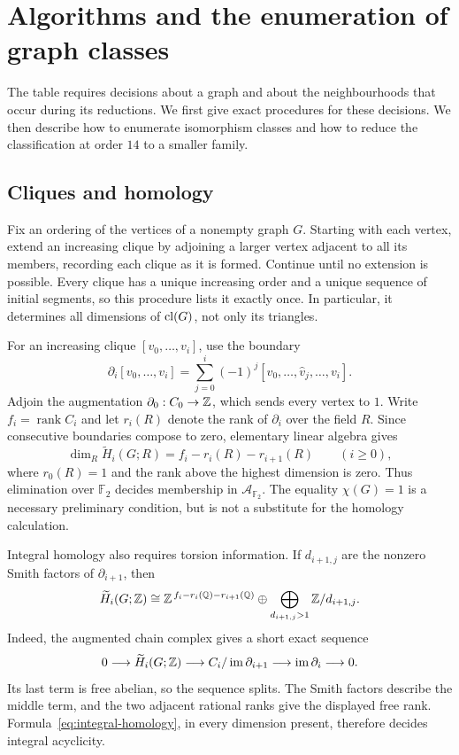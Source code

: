 \section{Algorithms and the enumeration of graph classes}\label{sec:algorithms}

The table requires decisions about a graph and about the neighbourhoods
that occur during its reductions. We first give exact procedures for
these decisions. We then describe how to enumerate isomorphism classes
and how to reduce the classification at order $14$ to a smaller family.

\subsection{Cliques and homology}

Fix an ordering of the vertices of a nonempty graph $G$. Starting with
each vertex, extend an increasing clique by adjoining a larger vertex
adjacent to all its members, recording each clique as it is formed.
Continue until no extension is possible.
Every clique has a unique increasing order and a unique sequence of
initial segments, so this procedure lists it exactly once. In particular,
it determines all dimensions of $\operatorname{cl}(G)$, not only its triangles.

For an increasing clique $[v_0,\ldots,v_i]$, use the boundary
\[
 \partial_i[v_0,\ldots,v_i]
   =\sum_{j=0}^i(-1)^j[v_0,\ldots,\widehat v_j,\ldots,v_i].
\]
Adjoin the augmentation $\partial_0:C_0\to\mathbb Z$, which sends every
vertex to $1$. Write $f_i=\operatorname{rank} C_i$ and let $r_i(R)$
denote the rank of $\partial_i$ over the field $R$. Since consecutive
boundaries compose to zero, elementary linear algebra gives
\begin{equation}\label{eq:betti}
 \dim_R\widetilde H_i(G;R)=f_i-r_i(R)-r_{i+1}(R)
 \qquad(i\ge0),
\end{equation}
where $r_0(R)=1$ and the rank above the highest dimension is zero.
Thus elimination over $\mathbb F_2$ decides membership in
$\mathcal A_{\mathbb F_2}$.
The equality $\chi(G)=1$ is a necessary preliminary condition, but is
not a substitute for the homology calculation.

Integral homology also requires torsion information. If $d_{i+1,j}$
are the nonzero Smith factors of $\partial_{i+1}$, then
\begin{equation}\label{eq:integral-homology}
 \widetilde H_i(G;\mathbb Z)\cong
 \mathbb Z^{\,f_i-r_i(\mathbb Q)-r_{i+1}(\mathbb Q)}
 \oplus\bigoplus_{d_{i+1,j}>1}\mathbb Z/d_{i+1,j}.
\end{equation}
Indeed, the augmented chain complex gives a short exact sequence
\[
 0\longrightarrow\widetilde H_i(G;\mathbb Z)
 \longrightarrow C_i/\operatorname{im}\partial_{i+1}
 \longrightarrow\operatorname{im}\partial_i\longrightarrow0.
\]
Its last term is free abelian, so the sequence splits. The Smith
factors describe the middle term, and the two adjacent rational ranks
give the displayed free rank. Formula~\eqref{eq:integral-homology},
in every dimension present, therefore decides integral acyclicity.

